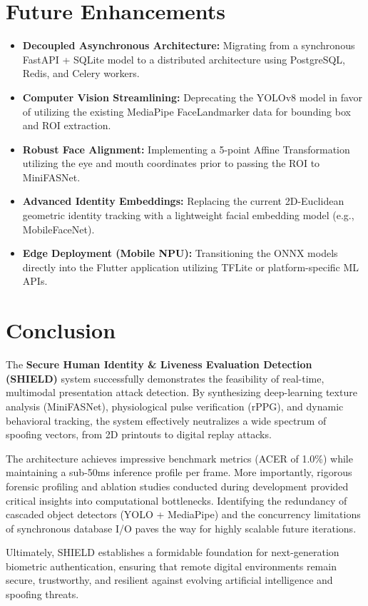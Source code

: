 \documentclass[12pt, a4paper]{report}
\begin{document}
\fi
\chapter{Future Enhancements}
\begin{itemize}
    \item \textbf{Decoupled Asynchronous Architecture:} Migrating from a synchronous FastAPI + SQLite model to a distributed architecture using PostgreSQL, Redis, and Celery workers.
    \item \textbf{Computer Vision Streamlining:} Deprecating the YOLOv8 model in favor of utilizing the existing MediaPipe FaceLandmarker data for bounding box and ROI extraction.
    \item \textbf{Robust Face Alignment:} Implementing a 5-point Affine Transformation utilizing the eye and mouth coordinates prior to passing the ROI to MiniFASNet.
    \item \textbf{Advanced Identity Embeddings:} Replacing the current 2D-Euclidean geometric identity tracking with a lightweight facial embedding model (e.g., MobileFaceNet).
    \item \textbf{Edge Deployment (Mobile NPU):} Transitioning the ONNX models directly into the Flutter application utilizing TFLite or platform-specific ML APIs.
\end{itemize}

\chapter{Conclusion}
The \textbf{Secure Human Identity \& Liveness Evaluation Detection (SHIELD)} system successfully demonstrates the feasibility of real-time, multimodal presentation attack detection. By synthesizing deep-learning texture analysis (MiniFASNet), physiological pulse verification (rPPG), and dynamic behavioral tracking, the system effectively neutralizes a wide spectrum of spoofing vectors, from 2D printouts to digital replay attacks. 

The architecture achieves impressive benchmark metrics (ACER of 1.0\%) while maintaining a sub-50ms inference profile per frame. More importantly, rigorous forensic profiling and ablation studies conducted during development provided critical insights into computational bottlenecks. Identifying the redundancy of cascaded object detectors (YOLO + MediaPipe) and the concurrency limitations of synchronous database I/O paves the way for highly scalable future iterations.

Ultimately, SHIELD establishes a formidable foundation for next-generation biometric authentication, ensuring that remote digital environments remain secure, trustworthy, and resilient against evolving artificial intelligence and spoofing threats.
\end{document}
